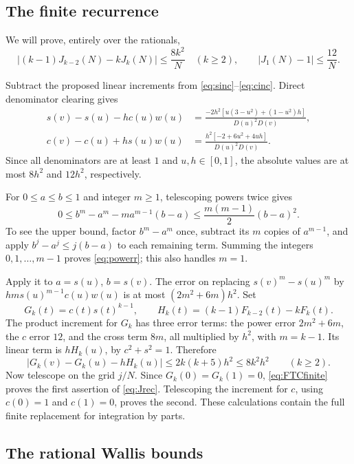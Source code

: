 \documentclass[11pt]{article}
\theoremstyle{definition}
\newcommand{\abs}[1]{\left|#1\right|}
\begin{document}
\subsection{The finite recurrence}

We will prove, entirely over the rationals,
\begin{equation}\label{eq:Jrec}
 \abs{(k-1)J_{k-2}(N)-kJ_k(N)}\le\frac{8k^2}{N}\quad(k\ge2),
 \qquad \abs{J_1(N)-1}\le\frac{12}{N}.
\end{equation}

Subtract the proposed linear increments from
\eqref{eq:sinc}--\eqref{eq:cinc}. Direct denominator clearing gives
\begin{align*}
 s(v)-s(u)-hc(u)w(u)
 &=\frac{-2h^2[u(3-u^2)+(1-u^2)h]}{D(u)^2D(v)},\\
 c(v)-c(u)+hs(u)w(u)
 &=\frac{h^2[-2+6u^2+4uh]}{D(u)^2D(v)}.
\end{align*}
Since all denominators are at least $1$ and $u,h\in[0,1]$, the
absolute values are at most $8h^2$ and $12h^2$, respectively.

For $0\le a\le b\le1$ and integer $m\ge1$, telescoping powers
twice gives
\begin{equation}\label{eq:powerr}
 0\le b^m-a^m-ma^{m-1}(b-a)
 \le\frac{m(m-1)}2(b-a)^2.
\end{equation}
To see the upper bound, factor $b^m-a^m$ once, subtract its $m$
copies of $a^{m-1}$, and apply
$b^j-a^j\le j(b-a)$ to each remaining term. Summing the integers
$0,1,\ldots,m-1$ proves \eqref{eq:powerr}; this also handles $m=1$.

Apply it to $a=s(u)$, $b=s(v)$. The error on replacing
$s(v)^m-s(u)^m$ by $hm s(u)^{m-1}c(u)w(u)$ is at most
$(2m^2+6m)h^2$. Set
\[
 G_k(t)=c(t)s(t)^{k-1},\qquad
 H_k(t)=(k-1)F_{k-2}(t)-kF_k(t).
\]
The product increment for $G_k$ has three error terms: the power error
$2m^2+6m$, the $c$ error $12$, and the cross term $8m$, all
multiplied by $h^2$, with $m=k-1$. Its linear term is $hH_k(u)$,
by $c^2+s^2=1$. Therefore
\[
 \abs{G_k(v)-G_k(u)-hH_k(u)}
 \le2k(k+5)h^2\le8k^2h^2\qquad(k\ge2).
\]
Now telescope on the grid $j/N$. Since $G_k(0)=G_k(1)=0$,
\eqref{eq:FTCfinite} proves the first assertion of
\eqref{eq:Jrec}. Telescoping the increment for $c$, using $c(0)=1$
and $c(1)=0$, proves the second. These calculations contain the full
finite replacement for integration by parts.

\subsection{The rational Wallis bounds}
\end{document}

